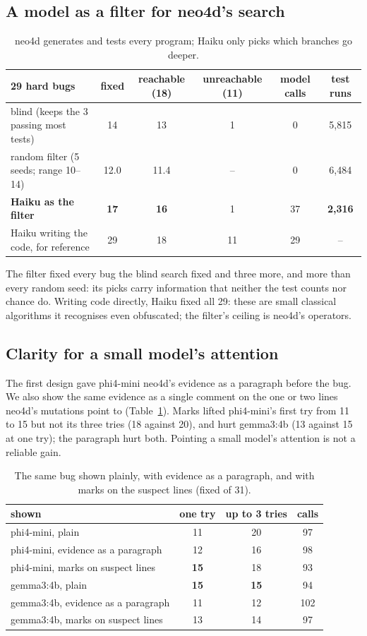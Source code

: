 \documentclass[10pt]{article}
\begin{document}
\subsection{A model as a filter for neo4d's search}
\label{sec:search}
\begin{table}[H]
\centering\small
\begin{tabular}{lccccc}
\toprule
29 hard bugs & fixed & reachable (18) & unreachable (11) & model calls & test runs\\
\midrule
blind (keeps the 3 passing most tests) & 14 & 13 & 1 & 0 & 5{,}815\\
random filter (5 seeds; range 10--14) & 12.0 & 11.4 & -- & 0 & 6{,}484\\
\textbf{Haiku as the filter} & \textbf{17} & \textbf{16} & 1 & 37 & \textbf{2{,}316}\\
Haiku writing the code, for reference & 29 & 18 & 11 & 29 & --\\
\bottomrule
\end{tabular}
\caption{neo4d generates and tests every program; Haiku only picks which branches go deeper.}
\end{table}
The filter fixed every bug the blind search fixed and three more, and more than every random seed: its picks carry
information that neither the test counts nor chance do. Writing code directly, Haiku fixed all 29: these are
small classical algorithms it recognises even obfuscated; the filter's ceiling is neo4d's operators.

\subsection{Clarity for a small model's attention}
The first design gave phi4-mini neo4d's evidence as a paragraph before the bug. We also show the same evidence as a
single comment on the one or two lines neo4d's mutations point to (Table~\ref{tab:attention}). Marks lifted
phi4-mini's first try from 11 to 15 but not its three tries (18 against 20), and hurt gemma3:4b (13 against 15 at one
try); the paragraph hurt both. Pointing a small model's attention is not a reliable gain.
\begin{table}[H]
\centering\small
\begin{tabular}{lccc}
\toprule
shown & one try & up to 3 tries & calls\\
\midrule
phi4-mini, plain & 11 & 20 & 97\\
phi4-mini, evidence as a paragraph & 12 & 16 & 98\\
phi4-mini, marks on suspect lines & \textbf{15} & 18 & 93\\
gemma3:4b, plain & \textbf{15} & \textbf{15} & 94\\
gemma3:4b, evidence as a paragraph & 11 & 12 & 102\\
gemma3:4b, marks on suspect lines & 13 & 14 & 97\\
\bottomrule
\end{tabular}
\caption{The same bug shown plainly, with evidence as a paragraph, and with marks on the suspect lines (fixed of 31).}
\label{tab:attention}
\end{table}
\end{document}
